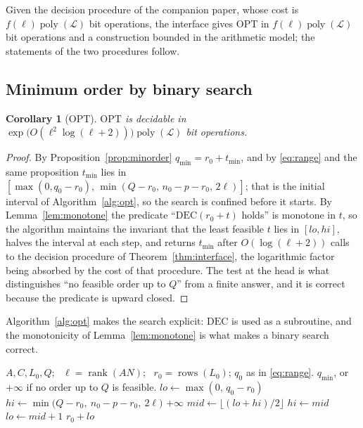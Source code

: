 ﻿\documentclass[journal]{IEEEtran}
\theoremstyle{plainn}
\newtheorem{cor}[thm]{Corollary}
\theoremstyle{remark}
\begin{document}
Given the decision procedure of the companion paper, whose cost is
$f(\ell)\operatorname{poly}(\mathcal L)$ bit operations, the interface gives $\mathrm{OPT}$ in
$f(\ell)\operatorname{poly}(\mathcal L)$ bit operations and a construction bounded in the arithmetic
model; the statements of the two procedures follow.

\subsection{Minimum order by binary search}\label{sec:bsearch}

\begin{cor}[$\mathrm{OPT}$]\label{cor:opt}
$\mathrm{OPT}$ is decidable in $\exp\bigl(O(\ell^2\log(\ell+2))\bigr)\operatorname{poly}(\mathcal L)$
bit operations.
\end{cor}

\begin{proof}
By Proposition~\ref{prop:minorder} $q_{\min}=r_0+t_{\min}$, and by \eqref{eq:range} and the same
proposition $t_{\min}$ lies in $[\max(0,q_0-r_0),\,\min(Q-r_0,\,n_0-p-r_0,\,2\ell)]$; that is the
initial interval of Algorithm~\ref{alg:opt}, so the search is confined before it starts. By
Lemma~\ref{lem:monotone} the predicate ``$\mathrm{DEC}(r_0+t)$ holds'' is monotone in $t$, so the
algorithm maintains the invariant that the least feasible $t$ lies in $[\mathit{lo},\mathit{hi}]$,
halves the interval at each step, and returns $t_{\min}$ after $O(\log(\ell+2))$ calls to the decision
procedure of Theorem~\ref{thm:interface}, the logarithmic factor being absorbed by the cost of that
procedure. The
test at the head is what distinguishes ``no feasible order up to $Q$'' from a finite answer, and it
is correct because the predicate is upward closed.
\end{proof}
Algorithm~\ref{alg:opt} makes the search explicit: $\mathrm{DEC}$ is used as a subroutine, and the
monotonicity of Lemma~\ref{lem:monotone} is what makes a binary search correct.


\begin{algorithm}[!t]
\caption{Minimum order $\mathrm{OPT}$, with $\mathrm{DEC}$ as a subroutine}
\label{alg:opt}
\begin{algorithmic}[1]
\Require $A,C,L_0,Q$; \ $\ell=\operatorname{rank}(AN)$; \ $r_0=\operatorname{rows}(L_0)$;
$q_0$ as in \eqref{eq:range}.
\Ensure $q_{\min}$, or $+\infty$ if no order up to $Q$ is feasible.
\State $\mathit{lo}\gets\max(0,\,q_0-r_0)$
\State $\mathit{hi}\gets\min\bigl(Q-r_0,\ n_0-p-r_0,\ 2\ell\bigr)$
  \State \Return $+\infty$
\EndIf
{}
  \State $\mathit{mid}\gets\lfloor(\mathit{lo}+\mathit{hi})/2\rfloor$
    \State $\mathit{hi}\gets\mathit{mid}$
  \Else
    \State $\mathit{lo}\gets\mathit{mid}+1$
  \EndIf
\EndWhile
\State \Return $r_0+\mathit{lo}$
\end{algorithmic}
\end{algorithm}
\end{document}
